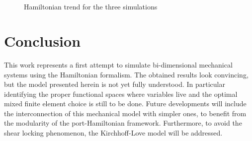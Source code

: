 \documentclass{ifacconf}
\begin{document}
\begin{figure}[h]%
	\centering
	\hspace{8pt}%
	 \\
	 \\
	\caption[Hamiltonian]{Hamiltonian trend for the three simulations}
	\label{fig:Hamiltonian}
\end{figure}


\section{Conclusion}
This work represents a first attempt to simulate bi-dimensional mechanical systems using the Hamiltonian formalism. The obtained results look convincing, but the model presented herein is not yet fully understood. In particular identifying the proper functional spaces where variables live and the optimal mixed finite element choice is still to be done. Future developments will include the interconnection of this mechanical model with simpler ones, to benefit from the modularity of the port-Hamiltonian framework. Furthermore, to avoid the shear locking phenomenon, the Kirchhoff-Love model will be addressed.
\end{document}
